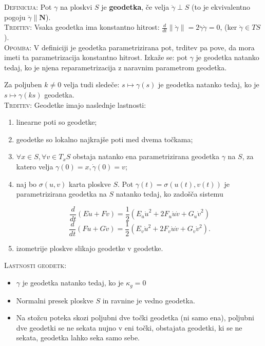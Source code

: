 \documentclass[8pt,a4paper]{amsart}
\theoremstyle{definition} %
\theoremstyle{plain} %
\begin{document}
\textsc{Definicija: }Pot $\gamma$ na ploskvi $S$ je \textbf{geodetka}, če velja $\ddot{\gamma} \perp S$ (to je ekvivalentno pogoju $\ddot{\gamma} \parallel \textbf{N}$).
\\

\textsc{Trditev:} Vsaka geodetka ima konstantno hitrost: $\frac{d}{dt} \| \dot{\gamma} \| = 2\ddot{\gamma}\dot{\gamma} = 0$, (ker $\dot{\gamma} \in TS$).
\\

\textsc{Opomba: }V definiciji je geodetka parametrizirana pot, trditev pa pove, da mora imeti ta parametrizacija konstantno hitrost. Izkaže se: pot $\gamma$ je geodetka natanko tedaj, ko je njena reparametrizacija z naravnim parametrom geodetka. 

Za poljuben $k \neq 0$ velja tudi sledeče: $s \mapsto \gamma (s)$ je geodetka natanko tedaj, ko je $s \mapsto \gamma (ks)$ geodetka. 
\\

\textsc{Trditev: }Geodetke imajo naslednje lastnosti:

\begin{enumerate}

\item linearne poti so geodetke;

\item geodetke so lokalno najkrajše poti med dvema točkama;

\item $\forall x \in S, \forall v \in T_xS$ obstaja natanko ena parametrizirana geodetka $\gamma$ na $S$, za katero velja $\gamma (0) = x, \dot{\gamma} (0)=v$;

\item naj bo $\sigma (u,v)$ karta ploskve $S$. Pot $\gamma (t) = \sigma (u(t),v(t))$ je parametrizirana geodetka na $S$ natanko tedaj, ko zadošča sistemu

$$
\frac{d}{dt}(E\dot{u} + F\dot{v}) = \frac{1}{2}(E_u \dot{u}^2+2F_u\dot{u}\dot{v} + G_u\dot{v}^2)
$$
$$
\frac{d}{dt}(F\dot{u} + G\dot{v}) = \frac{1}{2}(E_v \dot{u}^2+2F_v\dot{u}\dot{v} + G_v\dot{v}^2).
$$

\item izometrije ploskve slikajo geodetke v geodetke.

\end{enumerate}

\textsc{Lastnosti geodetk: }

\begin{itemize}

\item $\gamma$ je geodetka natanko tedaj, ko je $\kappa_g = 0$

\item Normalni presek ploskve $S$ in ravnine je vedno geodetka.

\item Na stožcu poteka skozi poljubni dve točki geodetka (ni samo ena), poljubni dve geodetki se ne sekata nujno v eni točki, obstajata geodetki, ki se ne sekata, geodetka lahko seka samo sebe.

\end{itemize}
\end{document}
